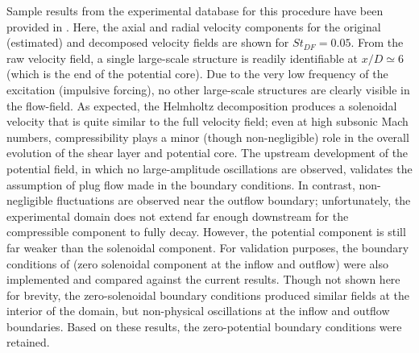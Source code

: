 Sample results from the experimental database for this procedure have been provided in .
Here, the axial and radial velocity components for the original (estimated) and decomposed velocity fields are shown for $St_{DF}=0.05$.
From the raw velocity field, a single large-scale structure is readily identifiable at $x/D \simeq 6$ (which is the end of the potential core).
Due to the very low frequency of the excitation (impulsive forcing), no other large-scale structures are clearly visible in the flow-field.
As expected, the Helmholtz decomposition produces a solenoidal velocity that is quite similar to the full velocity field; even at high subsonic Mach numbers, compressibility plays a minor (though non-negligible) role in the overall evolution of the shear layer and potential core.
The upstream development of the potential field, in which no large-amplitude oscillations are observed, validates the assumption of plug flow made in the boundary conditions.
In contrast, non-negligible fluctuations are observed near the outflow boundary; unfortunately, the experimental domain does not extend far enough downstream for the compressible component to fully decay.
However, the potential component is still far weaker than the solenoidal component.
For validation purposes, the boundary conditions of \citet{Unnikrishnan2015} (zero solenoidal component at the inflow and outflow) were also implemented and compared against the current results.
Though not shown here for brevity, the zero-solenoidal boundary conditions produced similar fields at the interior of the domain, but non-physical oscillations at the inflow and outflow boundaries.
Based on these results, the zero-potential boundary conditions were retained.
